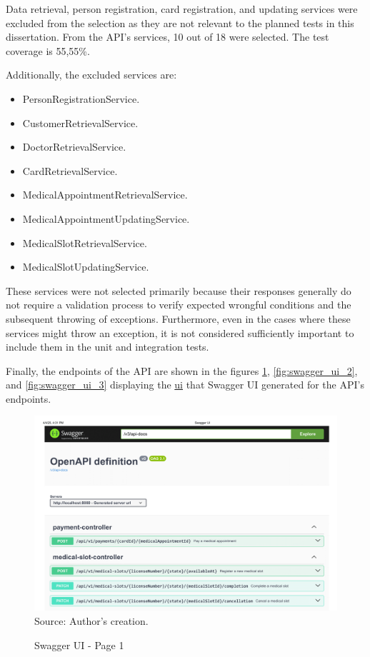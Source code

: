 Data retrieval, person registration, card registration, and updating services were excluded from the selection as they are not relevant to the planned tests in this dissertation. From the API's services, 10 out of 18 were selected. The test coverage is 55,55\%. 

Additionally, the excluded services are:

\begin{itemize}
    \item PersonRegistrationService.
    \item CustomerRetrievalService.
    \item DoctorRetrievalService.
    \item CardRetrievalService.
    \item MedicalAppointmentRetrievalService.
    \item MedicalAppointmentUpdatingService.
    \item MedicalSlotRetrievalService.
    \item MedicalSlotUpdatingService.
\end{itemize}

These services were not selected primarily because their responses generally do not require a validation process to verify expected wrongful conditions and the subsequent throwing of exceptions. Furthermore, even in the cases where these services might throw an exception, it is not considered sufficiently important to include them in the unit and integration tests.

Finally, the endpoints of the API are shown in the figures \ref{fig:swagger_ui_1}, \ref{fig:swagger_ui_2}, and \ref{fig:swagger_ui_3} 
displaying the \hyperref[appendix:glossary]{ui} that Swagger UI generated for the API's endpoints.

\begin{landscape}
    \begin{figure}[H]
        \centering
        \caption{Swagger UI - Page 1}
        \includegraphics[width=1\linewidth]{figures/Swagger UI-1.png}
        \label{fig:swagger_ui_1}
        \\ \footnotesize Source: Author's creation.
    \end{figure}
\end{landscape}

